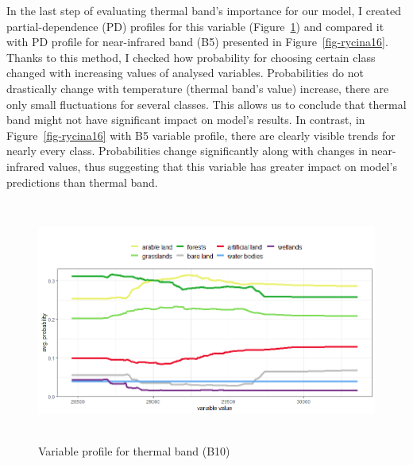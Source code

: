 \documentclass{amuthesis}
\begin{document}
In the last step of evaluating thermal band's importance for our model,
I created partial-dependence (PD) profiles for this variable
(Figure~\ref{fig-rycina15}) and compared it with PD profile for
near-infrared band (B5) presented in Figure~\ref{fig-rycina16}. Thanks
to this method, I checked how probability for choosing certain class
changed with increasing values of analysed variables. Probabilities do
not drastically change with temperature (thermal band's value) increase,
there are only small fluctuations for several classes. This allows us to
conclude that thermal band might not have significant impact on model's
results. In contrast, in Figure~\ref{fig-rycina16} with B5 variable
profile, there are clearly visible trends for nearly every class.
Probabilities change significantly along with changes in near-infrared
values, thus suggesting that this variable has greater impact on model's
predictions than thermal band.

\begin{figure}[t]

{\centering \includegraphics[width=5.90625in,height=3.125in]{./figures/profB10.png}

}

\caption{\label{fig-rycina15}Variable profile for thermal band (B10)}

\end{figure}
\end{document}
